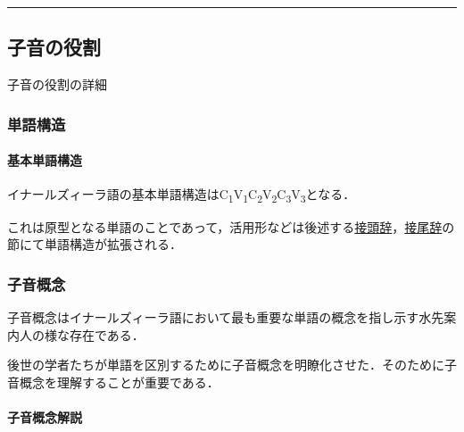 \documentclass[
  japanese,
]{article}
\begin{document}
\begin{center}\rule{0.5\linewidth}{0.5pt}\end{center}

\subsection{子音の役割}\label{chapter4}

子音の役割の詳細

\subsubsection{単語構造}\label{section4.1}

\paragraph{基本単語構造}\label{subsection4.1.1}

イナールズィーラ語の基本単語構造はC\textsubscript{1}V\textsubscript{1}C\textsubscript{2}V\textsubscript{2}C\textsubscript{3}V\textsubscript{3}となる．

これは原型となる単語のことであって，活用形などは後述する\hyperref[prefix]{接頭辞}，\hyperref[suffix]{接尾辞}の節にて単語構造が拡張される．

\subsubsection{子音概念}\label{section4.2}

\protect{}\label{consonant-concept}{子音概念}はイナールズィーラ語において最も重要な単語の概念を指し示す水先案内人の様な存在である．

後世の学者たちが単語を区別するために子音概念を明瞭化させた．そのために子音概念を理解することが重要である．

\paragraph{子音概念解説}\label{subsection4.2.1}
\end{document}
